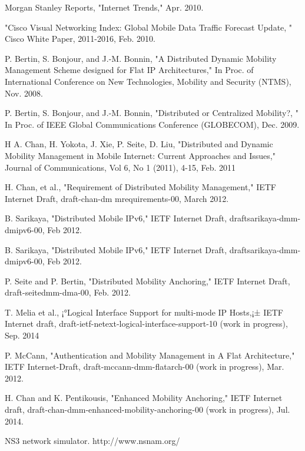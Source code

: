 \documentclass[runningheads,a4paper]{llncs}
\begin{document}
\begin{thebibliography}{4}

 Morgan Stanley Reports, "Internet Trends," Apr. 2010.

 "Cisco Visual Networking Index: Global Mobile Data Traffic Forecast Update, " Cisco White Paper, 2011-2016, Feb. 2010.

 P. Bertin, S. Bonjour, and J.-M. Bonnin, "A Distributed Dynamic Mobility Management Scheme designed for Flat IP Architectures," In Proc. of International Conference on New Technologies, Mobility and Security (NTMS), Nov. 2008.

 P. Bertin, S. Bonjour, and J.-M. Bonnin, "Distributed or Centralized Mobility?, " In Proc. of IEEE Global Communications Conference (GLOBECOM), Dec. 2009.

 H A. Chan, H. Yokota, J. Xie, P. Seite, D. Liu, "Distributed and Dynamic Mobility Management in Mobile Internet: Current Approaches and Issues," Journal of Communications, Vol 6, No 1 (2011), 4-15, Feb. 2011

 H. Chan, et al., "Requirement of Distributed Mobility Management," IETF Internet Draft, draft-chan-dm mrequirements-00, March 2012.

 B. Sarikaya, "Distributed Mobile IPv6," IETF Internet Draft, draftsarikaya-dmm-dmipv6-00, Feb 2012.

 B. Sarikaya, "Distributed Mobile IPv6," IETF Internet Draft, draftsarikaya-dmm-dmipv6-00, Feb 2012.

 P. Seite and P. Bertin, "Distributed Mobility Anchoring," IETF Internet Draft, draft-seitedmm-dma-00, Feb. 2012.

 T. Melia et al., ¡°Logical Interface Support for multi-mode IP Hosts,¡± IETF Internet draft, draft-ietf-netext-logical-interface-support-10 (work in progress), Sep. 2014

 P. McCann, "Authentication and Mobility Management in A Flat Architecture," IETF Internet-Draft, draft-mccann-dmm-flatarch-00 (work in progress), Mar. 2012.

 H. Chan and K. Pentikousis, "Enhanced Mobility Anchoring," IETF Internet draft, draft-chan-dmm-enhanced-mobility-anchoring-00 (work in progress), Jul. 2014.

 NS3 network simulator. http://www.nsnam.org/

\end{thebibliography}
\end{document}
